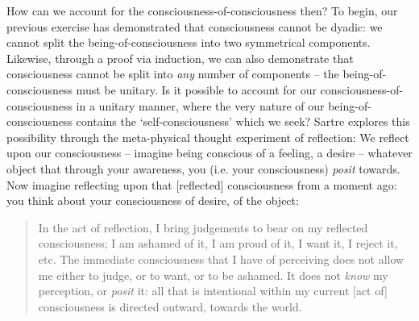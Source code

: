 How can we account for the consciousness-of-consciousness then? To begin, our previous exercise has demonstrated that consciousness cannot be dyadic: we cannot split the being-of-consciousness into two symmetrical components. Likewise, through a proof via induction, we can also demonstrate that consciousness cannot be split into \emph{any} number of components -- the being-of-consciousness must be unitary. Is it possible to account for our consciousness-of-consciousness in a unitary manner, where the very nature of our being-of-consciousness contains the \enquote*{self-consciousness} which we seek? Sartre explores this possibility through the meta-physical thought experiment of reflection: We reflect upon our consciousness -- imagine being conscious of a feeling, a desire -- whatever object that through your awareness, you (i.e. your consciousness) \emph{posit} towards. Now imagine reflecting upon that [reflected] consciousness from a moment ago: you think about your consciousness of desire, of the object:

\blockcquote[11]{Sartre}{
    In the act of reflection, I bring judgements to bear on my reflected consciousness; I am ashamed of it, I am proud of it, I want it, I reject it, etc. The immediate consciousness that I have of perceiving does not allow me either to judge, or to want, or to be ashamed. It does not \emph{know} my perception, or \emph{posit} it: all that is intentional within my current [act of] consciousness is directed outward, towards the world.
}

